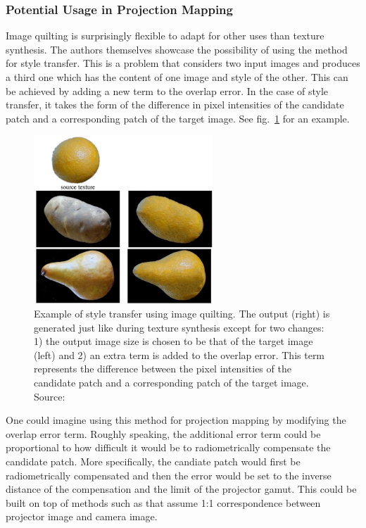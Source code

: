 \subsubsection{Potential Usage in Projection Mapping}
\label{section:background-texture_synthesis-patch_based-projection_mapping}

Image quilting is surprisingly flexible to adapt for other uses than texture synthesis. The authors themselves showcase the possibility of using the method for style transfer. This is a problem that considers two input images and produces a third one which has the content of one image and style of the other. This can be achieved by adding a new term to the overlap error. In the case of style transfer, it takes the form of the difference in pixel intensities of the candidate patch and a corresponding patch of the target image. See fig.~\ref{fig:background_quilting_transfer} for an example.

\begin{figure}[ht]
    \centering
    \includegraphics[width=0.6\textwidth]{images/02-quilting_transfer.jpg}
    \caption{Example of style transfer using image quilting. The output (right) is generated just like during texture synthesis except for two changes: 1) the output image size is chosen to be that of the target image (left) and 2) an extra term is added to the overlap error. This term represents the difference between the pixel intensities of the candidate patch and a corresponding patch of the target image. Source: \citet{Efros2001}}
    \label{fig:background_quilting_transfer}
\end{figure}

One could imagine using this method for projection mapping by modifying the overlap error term. Roughly speaking, the additional error term could be proportional to how difficult it would be to radiometrically compensate the candidate patch. More specifically, the candiate patch would first be radiometrically compensated and then the error would be set to the inverse distance of the compensation and the limit of the projector gamut. This could be built on top of methods such as \citet{Grundhofer2015} that assume 1:1 correspondence between projector image and camera image.

